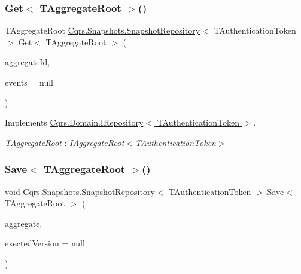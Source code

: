 \subsubsection{\texorpdfstring{Get$<$ T\+Aggregate\+Root $>$()}{Get< TAggregateRoot >()}}
{\footnotesize\ttfamily T\+Aggregate\+Root \hyperlink{classCqrs_1_1Snapshots_1_1SnapshotRepository}{Cqrs.\+Snapshots.\+Snapshot\+Repository}$<$ T\+Authentication\+Token $>$.Get$<$ T\+Aggregate\+Root $>$ (\begin{DoxyParamCaption}\item[{Guid}]{aggregate\+Id,  }\item[{I\+List$<$ \hyperlink{interfaceCqrs_1_1Events_1_1IEvent}{I\+Event}$<$ T\+Authentication\+Token $>$$>$}]{events = {\ttfamily null} }\end{DoxyParamCaption})}



Implements \hyperlink{interfaceCqrs_1_1Domain_1_1IRepository_a9a6f6fe2ae808009344f1eb8ad96f448_a9a6f6fe2ae808009344f1eb8ad96f448}{Cqrs.\+Domain.\+I\+Repository$<$ T\+Authentication\+Token $>$}.

\begin{Desc}
\item[Type Constraints]\begin{description}
\item[{\em T\+Aggregate\+Root} : {\em I\+Aggregate\+Root$<$T\+Authentication\+Token$>$}]\end{description}
\end{Desc}
\mbox{\label{classCqrs_1_1Snapshots_1_1SnapshotRepository_a4a7484e7754cae876f0c04e640eb80ff_a4a7484e7754cae876f0c04e640eb80ff}} 
\subsubsection{\texorpdfstring{Save$<$ T\+Aggregate\+Root $>$()}{Save< TAggregateRoot >()}}
{\footnotesize\ttfamily void \hyperlink{classCqrs_1_1Snapshots_1_1SnapshotRepository}{Cqrs.\+Snapshots.\+Snapshot\+Repository}$<$ T\+Authentication\+Token $>$.Save$<$ T\+Aggregate\+Root $>$ (\begin{DoxyParamCaption}\item[{T\+Aggregate\+Root}]{aggregate,  }\item[{int?}]{exected\+Version = {\ttfamily null} }\end{DoxyParamCaption})}



